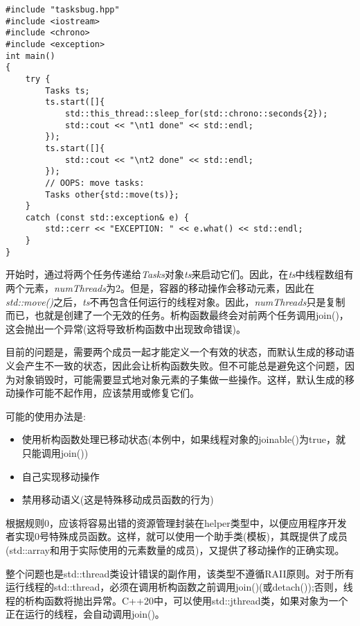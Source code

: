 {\color{red}{basics/tasksbug.cpp}}\par

\begin{lstlisting}[caption={}]
#include "tasksbug.hpp"
#include <iostream>
#include <chrono>
#include <exception>
int main()
{
	try {
		Tasks ts;
		ts.start([]{
			std::this_thread::sleep_for(std::chrono::seconds{2});
			std::cout << "\nt1 done" << std::endl;
		});
		ts.start([]{
			std::cout << "\nt2 done" << std::endl;
		});
		// OOPS: move tasks:
		Tasks other{std::move(ts)};
	}
	catch (const std::exception& e) {
		std::cerr << "EXCEPTION: " << e.what() << std::endl;
	}
}
\end{lstlisting}

开始时，通过将两个任务传递给\textit{Tasks}对象\textit{ts}来启动它们。因此，在\textit{ts}中线程数组有两个元素，\textit{numThreads}为2。但是，容器的移动操作会移动元素，因此在\textit{std::move()}之后，\textit{ts}不再包含任何运行的线程对象。因此，\textit{numThreads}只是复制而已，也就是创建了一个无效的任务。析构函数最终会对前两个任务调用join()，这会抛出一个异常(这将导致析构函数中出现致命错误)。\par

目前的问题是，需要两个成员一起才能定义一个有效的状态，而默认生成的移动语义会产生不一致的状态，因此会让析构函数失败。但不可能总是避免这个问题，因为对象销毁时，可能需要显式地对象元素的子集做一些操作。这样，默认生成的移动操作可能不起作用，应该禁用或修复它们。\par

可能的使用办法是:\par

\begin{itemize}
	\item 使用析构函数处理已移动状态(本例中，如果线程对象的joinable()为true，就只能调用join())
	\item 自己实现移动操作
	\item 禁用移动语义(这是特殊移动成员函数的行为)
\end{itemize}

根据规则0，应该将容易出错的资源管理封装在helper类型中，以便应用程序开发者实现0号特殊成员函数。这样，就可以使用一个助手类(模板)，其既提供了成员(std::array和用于实际使用的元素数量的成员)，又提供了移动操作的正确实现。\par

整个问题也是std::thread类设计错误的副作用，该类型不遵循RAII原则。对于所有运行线程的std::thread，必须在调用析构函数之前调用join()(或detach());否则，线程的析构函数将抛出异常。C++20中，可以使用std::jthread类，如果对象为一个正在运行的线程，会自动调用join()。\par




















